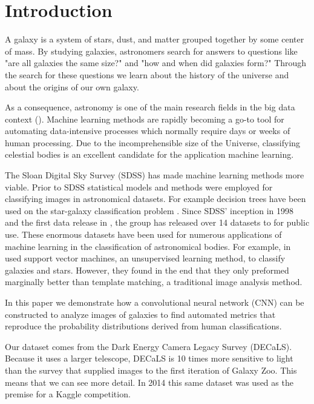 \section{Introduction}


A galaxy is a system of stars, dust, and matter grouped together by some center of mass. By studying galaxies, astronomers search for answers to questions like "are all galaxies the same size?" and "how and when did galaxies form?" Through the search for these questions we learn about the history of the universe and about the origins of our own galaxy.


As a consequence, astronomy is one of the main research fields in the big data context (\citeauthor{microsoft-galaxies}\cite{microsoft-galaxies}). Machine learning methods are rapidly becoming a go-to tool for automating data-intensive processes which normally require days or weeks of human processing. Due to the incomprehensible size of the Universe, classifying celestial bodies is an excellent candidate for the application machine learning.

The Sloan Digital Sky Survey (SDSS) has made machine learning methods more viable. Prior to SDSS statistical models and methods were employed for classifying images in astronomical datasets. For example decision trees have been used on the star-galaxy classification problem \cite{ball-decision-trees}. Since SDSS' inception in 1998 and the first data release in \citeyear{sdss-segue-1}, the group has released over 14 datasets to for public use. These enormous datasets have been used for numerous applications of machine learning in the classification of astronomical bodies. For example, \citeauthor{svn-galaxy} in \citeyear{svn-galaxy} used support vector machines, an unsupervised learning method, to classify galaxies and stars. However, they found in the end that they only preformed marginally better than template matching, a traditional image analysis method. \cite{svn-galaxy}

In this paper we demonstrate how a convolutional neural network (CNN) can be constructed to analyze images of galaxies to find automated metrics that reproduce the probability distributions derived from human classifications.

Our dataset comes from the Dark Energy Camera Legacy Survey (DECaLS). Because it uses a larger telescope, DECaLS is 10 times more sensitive to light than the survey that supplied images to the first iteration of Galaxy Zoo. This means that we can see more detail. \cite{zooniverse} In 2014 this same dataset was used as the premise for a Kaggle competition.

